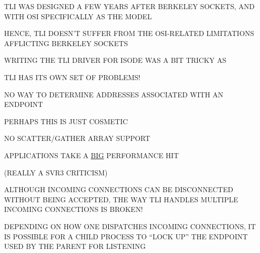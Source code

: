 \begin{bwslide}

\begin{nrtc}
\item	TLI WAS DESIGNED A FEW YEARS AFTER BERKELEY SOCKETS, AND WITH OSI
	SPECIFICALLY AS THE MODEL

\item	HENCE, TLI DOESN'T SUFFER FROM THE OSI-RELATED LIMITATIONS AFFLICTING
	BERKELEY SOCKETS

\item	WRITING THE TLI DRIVER FOR ISODE WAS A BIT TRICKY AS
    \begin{nrtc}
    \item	TLI HAS ITS OWN SET OF PROBLEMS!
    \end{nrtc}
\end{nrtc}
\end{bwslide}


\begin{bwslide}

\begin{nrtc}
\item	NO WAY TO DETERMINE ADDRESSES ASSOCIATED WITH AN ENDPOINT
    \begin{nrtc}
    \item	PERHAPS THIS IS JUST COSMETIC
    \end{nrtc}

\item	NO SCATTER/GATHER ARRAY SUPPORT
    \begin{nrtc}
    \item	APPLICATIONS TAKE A \underline{BIG} PERFORMANCE HIT
    \end{nrtc}
    (REALLY A SVR3 CRITICISM)

\item	ALTHOUGH INCOMING CONNECTIONS CAN BE DISCONNECTED WITHOUT BEING
	ACCEPTED, THE WAY TLI HANDLES MULTIPLE INCOMING CONNECTIONS IS BROKEN!
    \begin{nrtc}
    \item	DEPENDING ON HOW ONE DISPATCHES INCOMING CONNECTIONS,
		IT IS POSSIBLE FOR A CHILD PROCESS TO ``LOCK UP'' THE ENDPOINT
		USED BY THE PARENT FOR LISTENING
    \end{nrtc}
\end{nrtc}
\end{bwslide}


